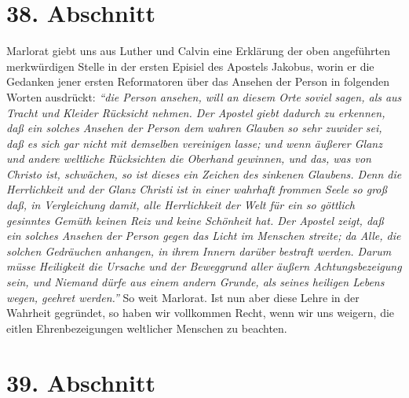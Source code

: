 \section{38. Abschnitt} \label{kap9_ab38}

Marlorat giebt uns aus Luther und Calvin eine Erklärung der oben angeführten
merkwürdigen Stelle in der ersten Episiel des Apostels Jakobus, worin er die
Gedanken jener ersten Reformatoren über das Ansehen der Person in folgenden
Worten ausdrückt:
\textit{"`die Person ansehen, will an diesem Orte soviel sagen, als
aus Tracht und Kleider Rücksicht nehmen. Der Apostel giebt dadurch zu erkennen,
daß ein solches Ansehen der Person dem wahren Glauben so sehr zuwider sei, daß
es sich gar nicht mit demselben vereinigen lasse; und wenn äußerer Glanz und
andere weltliche Rücksichten die Oberhand gewinnen, und das, was von Christo
ist, schwächen, so ist dieses ein Zeichen des sinkenen Glaubens. Denn die
Herrlichkeit und der Glanz Christi ist in einer wahrhaft frommen Seele so groß
daß, in Vergleichung damit, alle Herrlichkeit der Welt für ein so göttlich
gesinntes Gemüth keinen Reiz und keine Schönheit hat. Der Apostel zeigt, daß ein
solches Ansehen der Person gegen das Licht im Menschen streite; da Alle, die
solchen Gedräuchen anhangen, in ihrem Innern darüber bestraft werden. Darum
müsse Heiligkeit die Ursache und der Beweggrund aller äußern Achtungsbezeigung
sein, und Niemand dürfe aus einem andern Grunde, als seines heiligen Lebens
wegen, geehret werden."'} So weit Marlorat. Ist nun aber diese Lehre in der
Wahrheit gegründet, so haben wir vollkommen Recht, wenn wir uns weigern, die
eitlen Ehrenbezeigungen weltlicher Menschen zu beachten.

\section{39. Abschnitt} \label{kap9_ab39}


